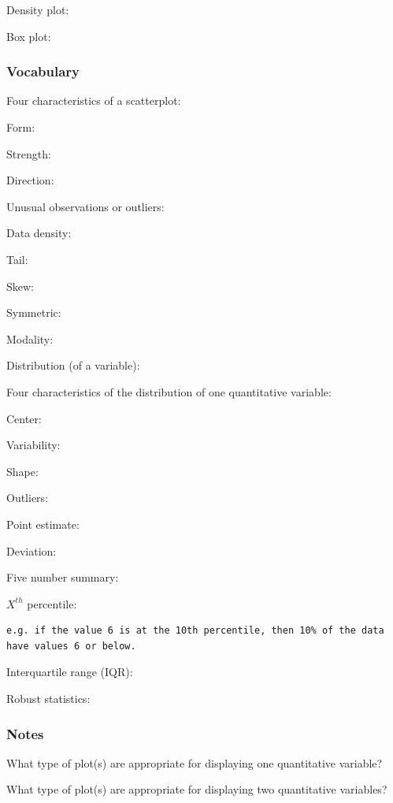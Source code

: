 \documentclass[
]{report}
\newcommand{\rgs}{\vspace{12pt}} %
\newcommand{\rgi}{\hspace{24pt}}  %
\begin{document}
Density plot:
\rgs

Box plot:
\rgs

\hypertarget{vocabulary-5}{%
\subsubsection*{Vocabulary}\label{vocabulary-5}}

Four characteristics of a scatterplot:

\rgi Form:
\rgs

\rgi Strength:
\rgs

\rgi Direction:
\rgs

\rgi Unusual observations or outliers:
\rgs

Data density:
\rgs

Tail:
\rgs

Skew:
\rgs

Symmetric:
\rgs

Modality:
\rgs

Distribution (of a variable):
\rgs

\rgi Four characteristics of the distribution of one quantitative variable:

\rgi Center:
\rgs

\rgi Variability:
\rgs

\rgi Shape:
\rgs

\rgi Outliers:
\rgs

Point estimate:
\rgs

Deviation:
\rgs

Five number summary:
\rgs

\(X^{th}\) percentile:
\rgs

\begin{verbatim}
e.g. if the value 6 is at the 10th percentile, then 10% of the data have values 6 or below.
\end{verbatim}

Interquartile range (IQR):
\rgs

Robust statistics:
\rgs

\hypertarget{notes-6}{%
\subsubsection*{Notes}\label{notes-6}}

What type of plot(s) are appropriate for displaying one quantitative variable?
\rgs

What type of plot(s) are appropriate for displaying two quantitative variables?
\rgs
\end{document}
